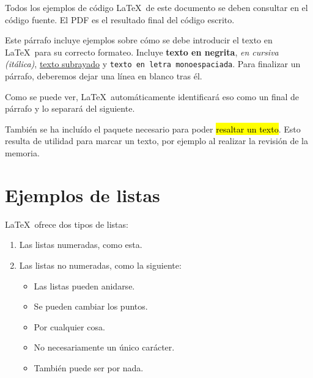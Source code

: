 





Todos los ejemplos de código \LaTeX\ de este documento se deben consultar en el código fuente. El PDF es el resultado final del código escrito.

Este párrafo incluye ejemplos sobre cómo se debe introducir el texto en \LaTeX\  para su correcto formateo. Incluye \textbf{texto en negrita}, \textit{en cursiva (itálica)}, \underline{texto subrayado} y \texttt{texto en letra monoespaciada}. Para finalizar un párrafo, deberemos dejar una línea en blanco tras él.

Como se puede ver, \LaTeX\ automáticamente identificará eso como un final de párrafo y lo separará del siguiente.

También se ha incluído el paquete necesario para poder \hl{resaltar un texto}. Esto resulta de utilidad para marcar un texto, por ejemplo al realizar la revisión de la memoria.

\section{Ejemplos de listas}

\LaTeX\ ofrece dos tipos de listas:

\begin{enumerate}
    \item Las listas numeradas, como esta.
    \item Las listas no numeradas, como la siguiente:
    \begin{itemize}
        \item Las listas pueden anidarse.
        \item Se pueden cambiar los puntos.
        \item[!] Por cualquier cosa.
        \item[NOTA] No necesariamente un único carácter.
        \item[] También puede ser por nada.
    \end{itemize}
\end{enumerate}


